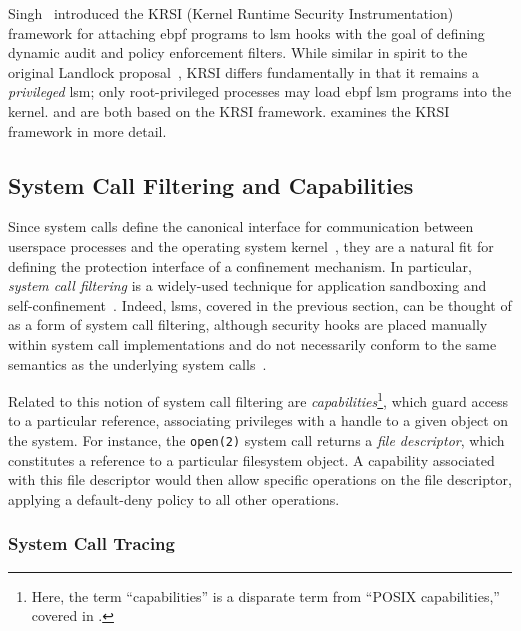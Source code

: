 Singh~\cite{singh2019_krsi} introduced the KRSI (Kernel Runtime Security Instrumentation)
framework for attaching \gls{ebpf} programs to \gls{lsm} hooks with the goal of defining
dynamic audit and policy enforcement filters. While similar in spirit to the original
Landlock proposal~\cite{salaun_landlock_patch}, KRSI differs fundamentally in that it
remains a \textit{privileged} \gls{lsm}; only root-privileged processes may load
\gls{ebpf} \gls{lsm} programs into the kernel. \bpfcontain{} and \bpfbox{} are both based
on the KRSI framework.  examines the KRSI framework in more
detail.




\subsection{System Call Filtering and Capabilities}%
\label{ss:syscall-filtering}

Since system calls define the canonical interface for communication between userspace
processes and the operating system kernel~\cite{jaeger2008_os_security}, they are
a natural fit for defining the protection interface of a confinement mechanism. In
particular, \textit{system call filtering} is a widely-used technique for application
sandboxing and self-confinement~\cite{anderson2017_comparison}. Indeed, \gls{lsm}s,
covered in the previous section, can be thought of as a form of system call filtering,
although security hooks are placed manually within system call implementations and do not
necessarily conform to the same semantics as the underlying system
calls~\cite{wright2002_lsm}.

Related to this notion of system call filtering are \textit{capabilities}\footnote{Here,
the term \enquote{capabilities} is a disparate term from \enquote{POSIX capabilities,}
covered in .}, which guard access to a particular reference, associating
privileges with a handle to a given object on the system. For instance, the
\texttt{open(2)} system call returns a \textit{file descriptor}, which constitutes
a reference to a particular filesystem object. A capability associated with this file
descriptor would then allow specific operations on the file descriptor, applying
a default-deny policy to all other operations.

\subsubsection*{System Call Tracing}
\label{sss:ptrace}

